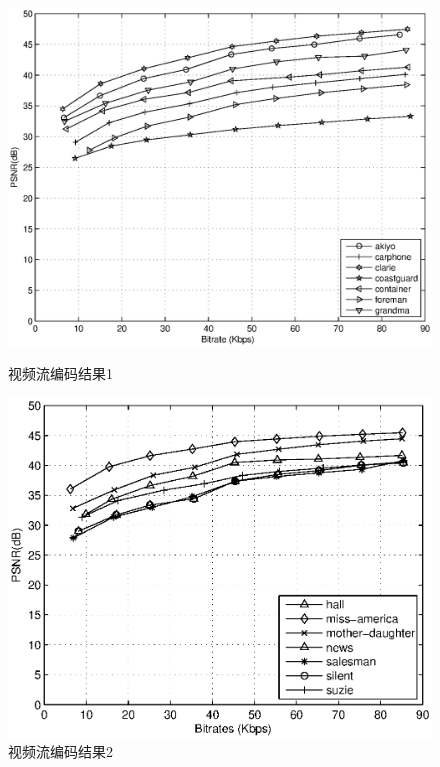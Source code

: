\begin{figure}[tb] 
  \begin{minipage}[t]{0.5\linewidth} 
    \centering 
    \includegraphics[width = \textwidth]{chap_nash_videobitrate_psnr1.eps} 
    \caption{视频流编码结果1} 
    \label{fig:chap_nash:video_psnr1} 
  \end{minipage}%
  \begin{minipage}[t]{0.5\linewidth} 
    \centering 
    \includegraphics[width=\textwidth]{chap_nash_videobitrate_psnr2.eps} 
    \caption{视频流编码结果2} 
    \label{fig:chap_nash:video_psnr2} 
  \end{minipage} 
\end{figure}

